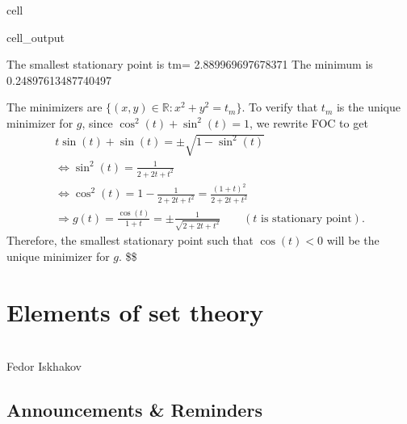\documentclass[letterpaper,10pt,english]{jupyterBook}
\begin{document}
\begin{sphinxuseclass}{cell}
\begin{sphinxVerbatimOutput}
\begin{sphinxuseclass}{cell_output}
\noindent{}

\begin{sphinxVerbatim}[commandchars=\\\{\}]
The smallest stationary point is tm=  2.889969697678371
The minimum is  \PYGZhy{}0.24897613487740497
\end{sphinxVerbatim}

\end{sphinxuseclass}\end{sphinxVerbatimOutput}

\end{sphinxuseclass}
\sphinxAtStartPar
The minimizers are \(\{(x,y)\in\mathbb{R}: x^2+y^2 = t_m\}\).
To verify that \(t_m\) is the unique minimizer for \(g\), since \(\cos^2(t) + \sin^2(t)=1\), we rewrite FOC to get
\begin{equation*}
\begin{split}
t\sin(t) + \sin(t) = \pm \sqrt{1-\sin^2(t)} \\
⇔ \sin^2(t) = \frac{1}{2 + 2t + t^2} \\
⇔ \cos^2(t) = 1 - \frac{1}{2+2t + t^2}=\frac{(1+t)^2}{2+2t + t^2}\\
⇒ g(t) = \frac{\cos(t)}{1+t} = \pm \frac{1}{\sqrt{2+2t +t^2}}  \qquad (\text{$t$ is stationary point}).\end{split}
\end{equation*}
\sphinxAtStartPar
Therefore, the smallest stationary point such that \(\cos(t) < 0\) will be the unique minimizer for \(g\).
\$\$

\sphinxstepscope


\chapter{Elements of set theory}
\label{\detokenize{03.set_theory:elements-of-set-theory}}\label{\detokenize{03.set_theory::doc}}
\sphinxAtStartPar
{}\\
Fedor Iskhakov


\section{Announcements \& Reminders}
\label{\detokenize{03.set_theory:announcements-reminders}}
\end{document}
